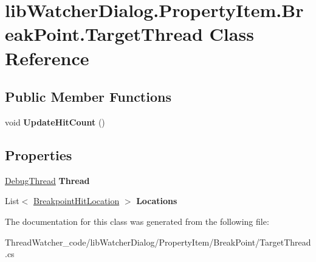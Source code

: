 \hypertarget{classlib_watcher_dialog_1_1_property_item_1_1_break_point_1_1_target_thread}{\section{lib\+Watcher\+Dialog.\+Property\+Item.\+Break\+Point.\+Target\+Thread Class Reference}
\label{classlib_watcher_dialog_1_1_property_item_1_1_break_point_1_1_target_thread}
}
\subsection*{Public Member Functions}
\begin{DoxyCompactItemize}
\item 
\hypertarget{classlib_watcher_dialog_1_1_property_item_1_1_break_point_1_1_target_thread_ad32f2f98eb31d0b72584c0e861ad4410}{void {\bfseries Update\+Hit\+Count} ()}\label{classlib_watcher_dialog_1_1_property_item_1_1_break_point_1_1_target_thread_ad32f2f98eb31d0b72584c0e861ad4410}

\end{DoxyCompactItemize}
\subsection*{Properties}
\begin{DoxyCompactItemize}
\item 
\hypertarget{classlib_watcher_dialog_1_1_property_item_1_1_break_point_1_1_target_thread_a9ec64afc7804868e393a4cd59d75fb54}{\hyperlink{classlib_wather_debugger_1_1_thread_1_1_debug_thread}{Debug\+Thread} {\bfseries Thread}}\label{classlib_watcher_dialog_1_1_property_item_1_1_break_point_1_1_target_thread_a9ec64afc7804868e393a4cd59d75fb54}

\item 
\hypertarget{classlib_watcher_dialog_1_1_property_item_1_1_break_point_1_1_target_thread_a0545c5de3b6c70fdcb06706baf4e4c51}{List$<$ \hyperlink{classlib_watcher_dialog_1_1_property_item_1_1_break_point_1_1_breakpoint_hit_location}{Breakpoint\+Hit\+Location} $>$ {\bfseries Locations}}\label{classlib_watcher_dialog_1_1_property_item_1_1_break_point_1_1_target_thread_a0545c5de3b6c70fdcb06706baf4e4c51}

\end{DoxyCompactItemize}


The documentation for this class was generated from the following file\+:\begin{DoxyCompactItemize}
\item 
Thread\+Watcher\+\_\+code/lib\+Watcher\+Dialog/\+Property\+Item/\+Break\+Point/Target\+Thread.\+cs\end{DoxyCompactItemize}
